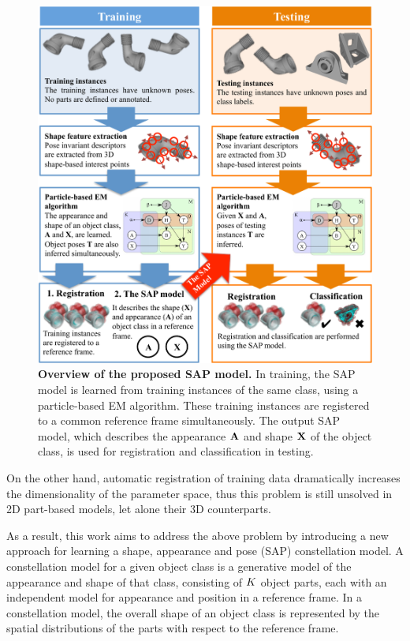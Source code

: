 \begin{figure}[!ht]
	\centering
	\includegraphics[width=1.0\linewidth]{./fig/reg/reg_intro.pdf}
	\caption{\textbf{Overview of the proposed SAP model.} In training, the SAP model is learned from training instances of the same class, using a particle-based EM algorithm. These training instances are registered to a common reference frame simultaneously. The output SAP model, which describes the appearance $\mathbf{A}$ and shape $\mathbf{X}$ of the object class, is used for registration and classification in testing.}
	\label{fig/reg/overview}
\end{figure}


On the other hand, automatic registration of training data dramatically increases the dimensionality of the parameter space, thus this problem is still unsolved in 2D part-based models, let alone their 3D counterparts. 

As a result, this work aims to address the above problem by introducing a new approach for learning a shape, appearance and pose (SAP) constellation model. A constellation model for a given object class is a generative model of the appearance and shape of that class, consisting of $K$ object parts, each with an independent model for appearance and position in a reference frame. In a constellation model, the overall shape of an object class is represented by the spatial distributions of the parts with respect to the reference frame.

